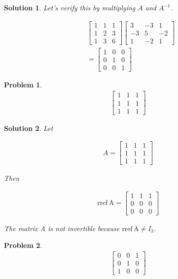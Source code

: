 \documentclass{article}
\newtheorem{problem}{Problem}
\newtheorem*{solution}{Solution}
\newcommand{\rref}[1]{\mathrm{rref \, #1}}
\begin{document}
\begin{solution}
Let's verify this by multiplying $A$ and $A^{-1}$.

\begin{align*}
& \begin{bmatrix}
1 & 1 & 1 \\
1 & 2 & 3 \\
1 & 3 & 6
\end{bmatrix}
\begin{bmatrix}
3 & -3 & 1 \\
-3 & 5 & -2 \\
1 & -2 & 1
\end{bmatrix} \\
&= \begin{bmatrix}
1 & 0 & 0 \\
0 & 1 & 0 \\
0 & 0 & 1
\end{bmatrix}
\end{align*}

\end{solution}

\begin{problem}
\begin{align*}
\begin{bmatrix}
1 & 1 & 1 \\
1 & 1 & 1 \\
1 & 1 & 1
\end{bmatrix}
\end{align*}
\end{problem}

\begin{solution}
Let

\begin{align*}
A = \begin{bmatrix}
1 & 1 & 1 \\
1 & 1 & 1 \\
1 & 1 & 1
\end{bmatrix}
\end{align*}

Then

\begin{align*}
\rref{A} = \begin{bmatrix}
1 & 1 & 1 \\
0 & 0 & 0 \\
0 & 0 & 0
\end{bmatrix}
\end{align*}

The matrix A is not invertible because $\rref{A} \neq I_{3}$.

\end{solution}

\begin{problem}
\begin{align*}
\begin{bmatrix}
0 & 0 & 1 \\
0 & 1 & 0 \\
1 & 0 & 0
\end{bmatrix}
\end{align*}
\end{problem}
\end{document}
